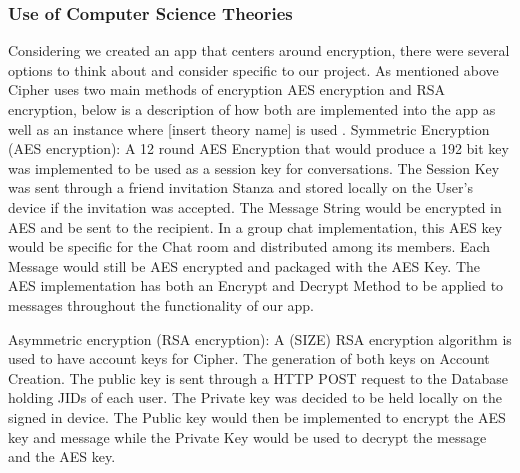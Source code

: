 \documentclass[12pt]{article}
\begin{document}
\subsubsection{Use of Computer Science Theories}
Considering we created an app that centers around encryption, there were several options to think about and consider specific to our project. As mentioned above Cipher uses two main methods of encryption AES encryption and RSA encryption, below is a description of how both are implemented into the app as well as an instance where [insert theory name] is used . 
Symmetric Encryption (AES encryption): A 12 round AES Encryption that would produce a 192 bit key was implemented to be used as a session key for conversations. The Session Key was sent through a friend invitation Stanza and stored locally on the User’s device if the invitation was accepted. The Message String would be encrypted in AES and be sent to the recipient. In a group chat implementation, this AES key would be specific for the Chat room and distributed among its members. Each Message would still be AES encrypted and packaged with the AES Key. The AES implementation has both an Encrypt and Decrypt Method to be applied to messages throughout the functionality of our app.

Asymmetric encryption (RSA encryption): A (SIZE) RSA encryption algorithm is used to have account keys for Cipher. The generation of both keys on Account Creation. The public key is sent through a HTTP POST request to the Database holding JIDs of each user. The Private key was decided to be held locally on the signed in device. The Public key would then be implemented to encrypt the AES key and message while the Private Key would be used to decrypt the message and the AES key.
 
\end{document}
